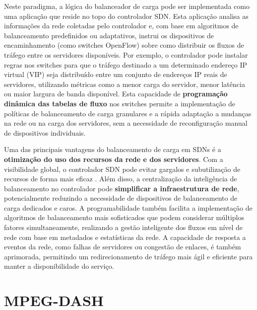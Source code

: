 Neste paradigma, a lógica do balanceador de carga pode ser implementada como uma aplicação que reside no topo do controlador SDN. Esta aplicação analisa as informações da rede coletadas pelo controlador e, com base em algoritmos de balanceamento predefinidos ou adaptativos, instrui os dispositivos de encaminhamento (como switches OpenFlow) sobre como distribuir os fluxos de tráfego entre os servidores disponíveis. Por exemplo, o controlador pode instalar regras nos switches para que o tráfego destinado a um determinado endereço IP virtual (VIP) seja distribuído entre um conjunto de endereços IP reais de servidores, utilizando métricas como a menor carga do servidor, menor latência ou maior largura de banda disponível. Esta capacidade de \textbf{programação dinâmica das tabelas de fluxo} nos switches permite a implementação de políticas de balanceamento de carga granulares e a rápida adaptação a mudanças na rede ou na carga dos servidores, sem a necessidade de reconfiguração manual de dispositivos individuais.

Uma das principais vantagens do balanceamento de carga em SDNs é a \textbf{otimização do uso dos recursos da rede e dos servidores}. Com a visibilidade global, o controlador SDN pode evitar gargalos e subutilização de recursos de forma mais eficaz \cite{Blial2016}. Além disso, a centralização da inteligência de balanceamento no controlador pode \textbf{simplificar a infraestrutura de rede}, potencialmente reduzindo a necessidade de dispositivos de balanceamento de carga dedicados e caros. A programabilidade também facilita a implementação de algoritmos de balanceamento mais sofisticados que podem considerar múltiplos fatores simultaneamente, realizando a gestão inteligente dos fluxos em nível de rede com base em metadados e estatísticas da rede. A capacidade de resposta a eventos da rede, como falhas de servidores ou congestão de enlaces, é também aprimorada, permitindo um redirecionamento de tráfego mais ágil e eficiente para manter a disponibilidade do serviço.

\section{MPEG-DASH}

